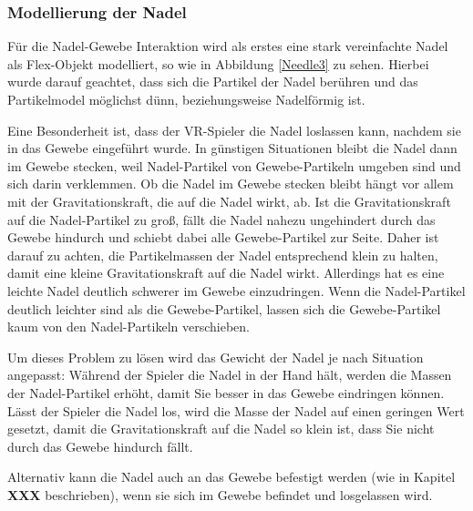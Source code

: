 \subsubsection{Modellierung der Nadel}
Für die Nadel-Gewebe Interaktion wird als erstes eine stark vereinfachte Nadel als Flex-Objekt modelliert, so wie in Abbildung \ref{Needle3} zu sehen. Hierbei wurde darauf geachtet, dass sich die Partikel der Nadel berühren und das Partikelmodel möglichst dünn, beziehungsweise Nadelförmig ist.


Eine Besonderheit ist, dass der VR-Spieler die Nadel loslassen kann, nachdem sie in das Gewebe eingeführt wurde. In günstigen Situationen bleibt die Nadel dann im Gewebe stecken, weil Nadel-Partikel von Gewebe-Partikeln umgeben sind und sich darin verklemmen. 
Ob die Nadel im Gewebe stecken bleibt hängt vor allem mit der Gravitationskraft, die auf die Nadel wirkt, ab.
Ist die Gravitationskraft auf die Nadel-Partikel zu groß, fällt die Nadel nahezu ungehindert durch das Gewebe hindurch und schiebt dabei alle Gewebe-Partikel zur Seite. Daher ist darauf zu achten, die Partikelmassen der Nadel entsprechend klein zu halten, damit eine kleine Gravitationskraft auf die Nadel wirkt. Allerdings hat es eine leichte Nadel deutlich schwerer im Gewebe einzudringen. Wenn die Nadel-Partikel deutlich leichter sind als die Gewebe-Partikel, lassen sich die Gewebe-Partikel kaum von den Nadel-Partikeln verschieben.

Um dieses Problem zu lösen wird das Gewicht der Nadel je nach Situation angepasst: Während der Spieler die Nadel in der Hand hält, werden die Massen der Nadel-Partikel erhöht, damit Sie besser in das Gewebe eindringen können. Lässt der Spieler die Nadel los, wird die Masse der Nadel auf einen geringen Wert gesetzt, damit die Gravitationskraft auf die Nadel so klein ist, dass Sie nicht durch das Gewebe hindurch fällt. 

Alternativ kann die Nadel auch an das Gewebe befestigt werden (wie in Kapitel \textbf{XXX} beschrieben), wenn sie sich im Gewebe befindet und losgelassen wird.



